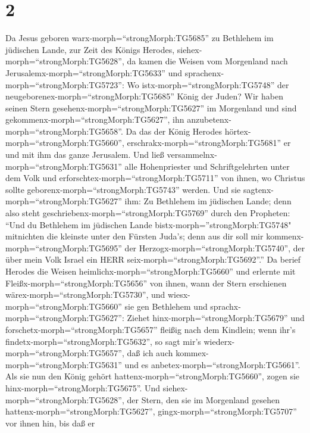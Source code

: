 \hypertarget{section-1}{%
\section{2}\label{section-1}}

 Da Jesus geboren warx-morph=``strongMorph:TG5685'' zu
Bethlehem im jüdischen Lande, zur Zeit des Königs Herodes,
siehex-morph=``strongMorph:TG5628'', da kamen die Weisen vom Morgenland
nach Jerusalemx-morph=``strongMorph:TG5633'' und
sprachenx-morph=``strongMorph:TG5723'':  Wo
istx-morph=``strongMorph:TG5748'' der
neugeborenex-morph=``strongMorph:TG5685'' König der Juden? Wir haben
seinen Stern gesehenx-morph=``strongMorph:TG5627'' im Morgenland und
sind gekommenx-morph=``strongMorph:TG5627'', ihn
anzubetenx-morph=``strongMorph:TG5658''.  Da das der König
Herodes hörtex-morph=``strongMorph:TG5660'',
erschrakx-morph=``strongMorph:TG5681'' er und mit ihm das ganze
Jerusalem.  Und ließ
versammelnx-morph=``strongMorph:TG5631'' alle Hohenpriester und
Schriftgelehrten unter dem Volk und
erforschtex-morph=``strongMorph:TG5711'' von ihnen, wo Christus sollte
geborenx-morph=``strongMorph:TG5743'' werden.  Und sie
sagtenx-morph=``strongMorph:TG5627'' ihm: Zu Bethlehem im jüdischen
Lande; denn also steht geschriebenx-morph=``strongMorph:TG5769'' durch
den Propheten:  ``Und du Bethlehem im jüdischen Lande
bistx-morph=''strongMorph:TG5748" mitnichten die kleinste unter den
Fürsten Juda's; denn aus dir soll mir
kommenx-morph=``strongMorph:TG5695'' der
Herzogx-morph=``strongMorph:TG5740'', der über mein Volk Israel ein HERR
seix-morph=``strongMorph:TG5692''.''  Da berief Herodes die
Weisen heimlichx-morph=``strongMorph:TG5660'' und erlernte mit
Fleißx-morph=``strongMorph:TG5656'' von ihnen, wann der Stern erschienen
wärex-morph=``strongMorph:TG5730'',  und
wiesx-morph=``strongMorph:TG5660'' sie gen Bethlehem und
sprachx-morph=``strongMorph:TG5627'': Ziehet
hinx-morph=``strongMorph:TG5679'' und
forschetx-morph=``strongMorph:TG5657'' fleißig nach dem Kindlein; wenn
ihr's findetx-morph=``strongMorph:TG5632'', so sagt mir's
wiederx-morph=``strongMorph:TG5657'', daß ich auch
kommex-morph=``strongMorph:TG5631'' und es
anbetex-morph=``strongMorph:TG5661''.  Als sie nun den König
gehört hattenx-morph=``strongMorph:TG5660'', zogen sie
hinx-morph=``strongMorph:TG5675''. Und
siehex-morph=``strongMorph:TG5628'', der Stern, den sie im Morgenland
gesehen hattenx-morph=``strongMorph:TG5627'',
gingx-morph=``strongMorph:TG5707'' vor ihnen hin, bis daß er
